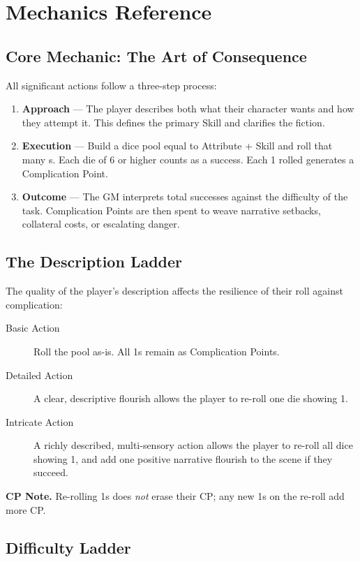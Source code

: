 \chapter{Mechanics Reference}

\section{Core Mechanic: The Art of Consequence}

All significant actions follow a three-step process:

\begin{enumerate}
\item \textbf{Approach} --- The player describes both what their character wants and how they attempt it. This defines the primary Skill and clarifies the fiction.
\item \textbf{Execution} --- Build a dice pool equal to Attribute + Skill and roll that many s. Each die of 6 or higher counts as a success. Each 1 rolled generates a Complication Point.
\item \textbf{Outcome} --- The GM interprets total successes against the difficulty of the task. Complication Points are then spent to weave narrative setbacks, collateral costs, or escalating danger.
\end{enumerate}

\section{The Description Ladder}

The quality of the player's description affects the resilience of their roll against complication:

\begin{description}
\item[Basic Action] Roll the pool as-is. All 1s remain as Complication Points.
\item[Detailed Action] A clear, descriptive flourish allows the player to re-roll one die showing 1.
\item[Intricate Action] A richly described, multi-sensory action allows the player to re-roll all dice showing 1, and add one positive narrative flourish to the scene if they succeed.
\end{description}

\noindent\textbf{CP Note.} Re-rolling 1s does \emph{not} erase their CP; any new 1s on the re-roll add more CP.

\section{Difficulty Ladder}

